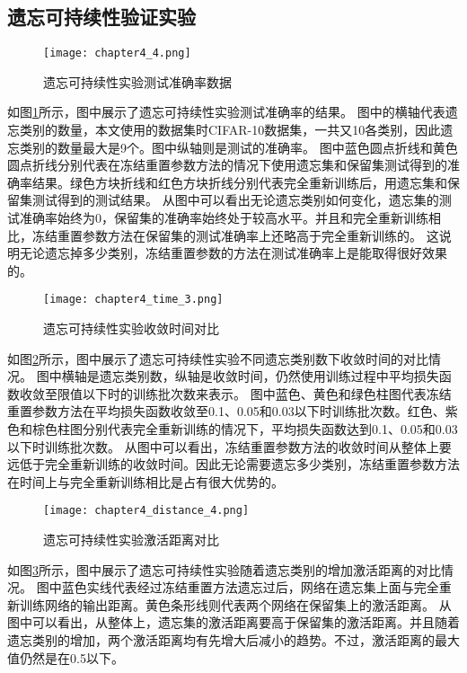 \subsection{遗忘可持续性验证实验}
\begin{figure}
    \centering
    \texttt{[image: chapter4\_4.png]}
    \caption{遗忘可持续性实验测试准确率数据}
    \label{fig:chapter4_4}
\end{figure}
如图\ref{fig:chapter4_4}所示，图中展示了遗忘可持续性实验测试准确率的结果。
图中的横轴代表遗忘类别的数量，本文使用的数据集时CIFAR-10数据集，一共又10各类别，因此遗忘类别的数量最大是9个。图中纵轴则是测试的准确率。
图中蓝色圆点折线和黄色圆点折线分别代表在冻结重置参数方法的情况下使用遗忘集和保留集测试得到的准确率结果。绿色方块折线和红色方块折线分别代表完全重新训练后，用遗忘集和保留集测试得到的测试结果。
从图中可以看出无论遗忘类别如何变化，遗忘集的测试准确率始终为0，保留集的准确率始终处于较高水平。并且和完全重新训练相比，冻结重置参数方法在保留集的测试准确率上还略高于完全重新训练的。
这说明无论遗忘掉多少类别，冻结重置参数的方法在测试准确率上是能取得很好效果的。

\begin{figure}
    \centering
    \texttt{[image: chapter4\_time\_3.png]}
    \caption{遗忘可持续性实验收敛时间对比}
    \label{fig:chapter4_time_3}
\end{figure}
如图\ref{fig:chapter4_time_3}所示，图中展示了遗忘可持续性实验不同遗忘类别数下收敛时间的对比情况。
图中横轴是遗忘类别数，纵轴是收敛时间，仍然使用训练过程中平均损失函数收敛至限值以下时的训练批次数来表示。
图中蓝色、黄色和绿色柱图代表冻结重置参数方法在平均损失函数收敛至0.1、0.05和0.03以下时训练批次数。红色、紫色和棕色柱图分别代表完全重新训练的情况下，平均损失函数达到0.1、0.05和0.03以下时训练批次数。
从图中可以看出，冻结重置参数方法的收敛时间从整体上要远低于完全重新训练的收敛时间。因此无论需要遗忘多少类别，冻结重置参数方法在时间上与完全重新训练相比是占有很大优势的。

\begin{figure}
    \centering
    \texttt{[image: chapter4\_distance\_4.png]}
    \caption{遗忘可持续性实验激活距离对比}
    \label{fig:chapter4_distance_4}
\end{figure}
如图\ref{fig:chapter4_distance_4}所示，图中展示了遗忘可持续性实验随着遗忘类别的增加激活距离的对比情况。
图中蓝色实线代表经过冻结重置方法遗忘过后，网络在遗忘集上面与完全重新训练网络的输出距离。黄色条形线则代表两个网络在保留集上的激活距离。
从图中可以看出，从整体上，遗忘集的激活距离要高于保留集的激活距离。并且随着遗忘类别的增加，两个激活距离均有先增大后减小的趋势。不过，激活距离的最大值仍然是在0.5以下。
